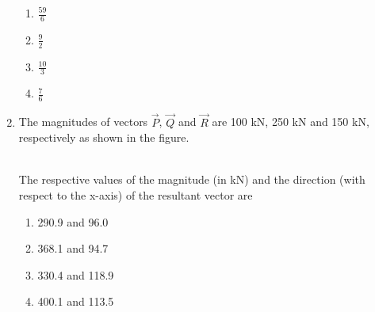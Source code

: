 \documentclass[journal]{IEEEtran}
\begin{document}
\begin{enumerate}
\begin{enumerate}
    \item $\frac{59}{6}$
    \item $\frac{9}{2}$
    \item $\frac{10}{3}$
    \item $\frac{7}{6}$ \\
\end{enumerate}
\item The magnitudes of vectors $\vec{P}$, $\vec{Q}$ and $\vec{R}$ are 100 kN, 250 kN and 150 kN, respectively as shown in the figure.
\begin{figure}[!ht]
\centering
\resizebox{0.5\textwidth}{!}{%

}%
\end{figure}
\\
The respective values of the magnitude (in kN) and the direction (with respect to the x-axis) of the resultant vector are 
\begin{enumerate}
    \item 290.9 and 96.0\degree
    \item 368.1 and 94.7\degree
    \item 330.4 and 118.9\degree
    \item 400.1 and 113.5\degree
\end{enumerate}
			 \end{enumerate}
			 
\end{document}

